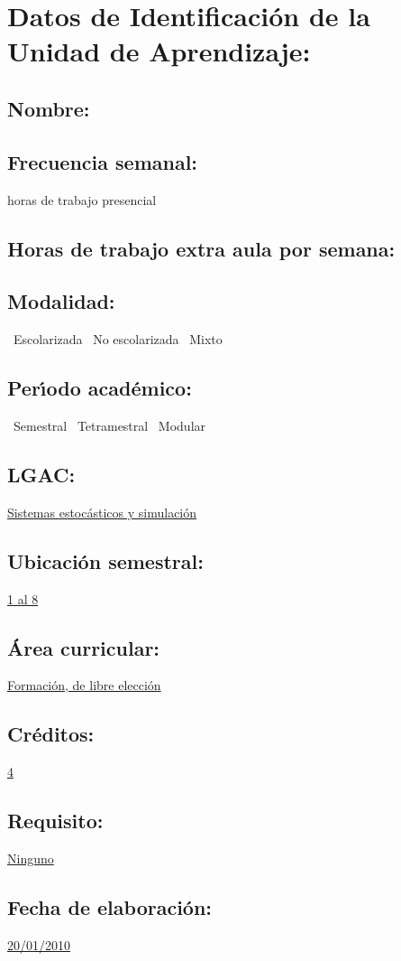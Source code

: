 \documentclass[10 pt]{article}
\begin{document}

\section{Datos de Identificaci\'{o}n de la Unidad de Aprendizaje:}
\subsection{Nombre:} 
\subsection{Frecuencia semanal:} horas de trabajo presencial 
\subsection{Horas de trabajo extra aula por semana:} 
\subsection{Modalidad:} \yes~Escolarizada \no~No escolarizada \no~Mixto
\subsection{Per\'{\i}odo acad\'{e}mico:} \yes~Semestral
\no~Tetramestral \no~Modular
\subsection{LGAC:} \underline{Sistemas estoc\'{a}sticos y simulaci\'{o}n}
\subsection{Ubicaci\'{o}n semestral:} \underline{1 al 8}
\subsection{\'{A}rea curricular:} \underline{Formaci\'{o}n, de libre elecci\'{o}n}
\subsection{Cr\'{e}ditos:} \underline{4}
\subsection{Requisito:} \underline{Ninguno}
\subsection{Fecha de elaboraci\'{o}n:} \underline{20/01/2010}
\end{document}
